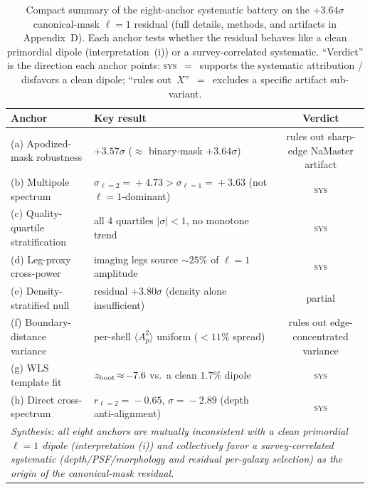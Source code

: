 \documentclass[aps,prd,twocolumn,superscriptaddress,preprintnumbers,nofootinbib,longbibliography,floatfix]{revtex4-2}
\newcommand{\sigmaunit}{\sigma}
\begin{document}
\begin{table}[tbp]
\caption{Compact summary of the eight-anchor systematic battery on the $+3.64\sigmaunit$ canonical-mask $\ell\!=\!1$ residual (full details, methods, and artifacts in Appendix~D). Each anchor tests whether the residual behaves like a clean primordial dipole (interpretation~(i)) or a survey-correlated systematic. ``Verdict'' is the direction each anchor points: \textsc{sys}~$=$~supports the systematic attribution / disfavors a clean dipole; ``rules out~$X$''~$=$~excludes a specific artifact sub-variant.\label{tab:eightanchor_summary}}
\begin{ruledtabular}
\begin{tabular}{llc}
\textbf{Anchor} & \textbf{Key result} & \textbf{Verdict} \\
\hline
(a) Apodized-mask robustness & $+3.57\sigmaunit$ ($\approx$ binary-mask $+3.64\sigmaunit$) & rules out sharp-edge NaMaster artifact \\
(b) Multipole spectrum & $\sigma_{\ell=2}\!=\!+4.73\!>\!\sigma_{\ell=1}\!=\!+3.63$ (not $\ell\!=\!1$-dominant) & \textsc{sys} \\
(c) Quality-quartile stratification & all 4 quartiles $|\sigma|\!<\!1$, no monotone trend & \textsc{sys} \\
(d) Leg-proxy cross-power & imaging legs source $\sim\!25\%$ of $\ell\!=\!1$ amplitude & \textsc{sys} \\
(e) Density-stratified null & residual $+3.80\sigmaunit$ (density alone insufficient) & partial \\
(f) Boundary-distance variance & per-shell $\langle A_p^2\rangle$ uniform ($<\!11\%$ spread) & rules out edge-concentrated variance \\
(g) WLS template fit & $z_{\rm boot}\!\approx\!-7.6$ vs.\ a clean $1.7\%$ dipole & \textsc{sys} \\
(h) Direct cross-spectrum & $r_{\ell=2}\!=\!-0.65$, $\sigma\!=\!-2.89$ (depth anti-alignment) & \textsc{sys} \\
\hline
\multicolumn{3}{p{0.95\textwidth}}{\emph{Synthesis: all eight anchors are mutually inconsistent with a clean primordial $\ell\!=\!1$ dipole (interpretation (i)) and collectively favor a survey-correlated systematic (depth/PSF/morphology and residual per-galaxy selection) as the origin of the canonical-mask residual.}} \\
\end{tabular}
\end{ruledtabular}
\end{table}
\end{document}
